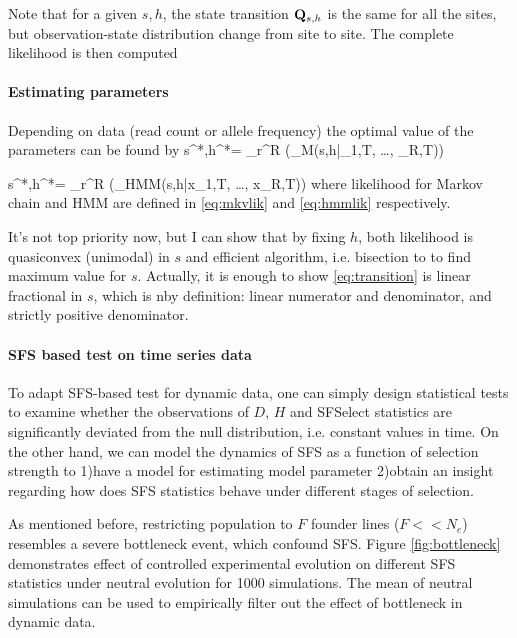 \documentclass[11pt]{article}
\begin{document}
Note that for a given $s,h$, the state transition ${\mathbf Q}_{s,h}$ is the same for all 
the sites, but observation-state distribution change from site to site.
The complete likelihood is then computed

\paragraph{Estimating parameters} 
\label{sec:regression}
Depending on data (read count or allele frequency) the optimal value of the parameters can be found by
\beq
s^*,h^*= \sum_r^R \log \left(\Lc_M(s,h|\nu_{1,T}, \ldots, \nu_{R,T})\right) \label{eq:mkvml}
\eeq

\beq
s^*,h^*= \sum_r^R \log \left(\Lc_{HMM}(s,h|x_{1,T}, \ldots, x_{R,T})\right) \label{eq:hmmml}
\eeq
where likelihood for Markov chain and HMM are defined in \eqref{eq:mkvlik} and \eqref{eq:hmmlik} respectively. 

It's not top priority now, but I can show that by fixing $h$, both likelihood is quasiconvex (unimodal) in $s$ and efficient algorithm, i.e. bisection to to find maximum value for $s$. Actually, it is enough to show \eqref{eq:transition} is linear fractional in $s$, which is nby definition: linear numerator and denominator, and strictly positive denominator.
\paragraph{SFS based test on time series data}\label{sec:sfs-ts}
To adapt SFS-based test for dynamic data, one can simply design statistical 
tests to examine whether the 
observations of $D$, $H$ and SFSelect statistics are 
significantly deviated 
from the null distribution, i.e. constant values in time.
On the other hand, we can model the dynamics of SFS as a 
function of selection 
strength to 1)have a model for estimating model parameter 2)obtain an insight 
regarding how does SFS statistics behave under different 
stages of selection.

As mentioned before, restricting population to $F$ founder lines ($F<<N_e$) 
resembles a severe bottleneck event, which confound SFS. Figure 
\ref{fig:bottleneck} demonstrates effect of controlled experimental evolution 
on different SFS statistics under neutral evolution for 1000 simulations. The 
mean of 
neutral simulations can be used to empirically filter out the effect of 
bottleneck in dynamic data. 
\end{document}
